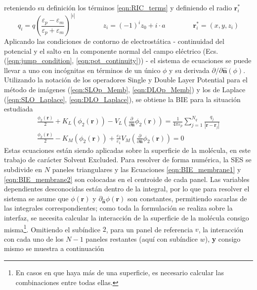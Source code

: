 \documentclass[12pt, oneside, numbers, spanish]{ezthesis}
\numberwithin{equation}{section}
\begin{document}
reteniendo su definición los términos \ref{eqn:RIC_terms} y definiendo el radio $\mathbf{r}^*_i$
\begin{equation*}
q_i = q\left(\frac{\varepsilon_p - \varepsilon_m}{\varepsilon_p + \varepsilon_m}\right)^{|i|} \qquad\qquad z_i=(-1)^iz_0 + i\cdot a \qquad\qquad \mathbf{r}^*_i = (x, y, z_i)
\end{equation*}
Aplicando las condiciones de contorno de electrostática - continuidad del potencial y el salto en la componente normal del campo eléctrico (Ecs. (\ref{eqn:jump_condition}, \ref{eqn:pot_continuity})) - el sistema de ecuaciones se puede llevar a uno con incógnitas en términos de un único $\phi$ y su derivada $\partial/\partial\hat{\mathbf{n}}(\phi)$. Utilizando la notación de los operadores Single y Double Layer Potential para el método de imágenes (\ref{eqn:SLOp_Memb}, \ref{eqn:DLOp_Memb}) y los de Laplace (\ref{eqn:SLO_Laplace}, \ref{eqn:DLO_Laplace}), se obtiene la BIE para la situación estudiada
\begin{gather}
\frac{\phi_2(\mathbf{r})}{2} + K_L(\phi_2(\mathbf{r})) - V_L\left(\frac{\partial}{\partial\hat{\mathbf{n}}}\phi_2(\mathbf{r})\right) = \frac{1}{4\pi\varepsilon_p}\sum_{j = 1}^{N_q}\frac{q_j}{|\mathbf{r} - \mathbf{r}_j|}\label{eqn:BIE_membrane1}\\
\frac{\phi_2(\mathbf{r})}{2} - K_M(\phi_2(\mathbf{r})) + \frac{\varepsilon_2}{\varepsilon_1}V_M\left(\frac{\partial}{\partial\hat{\mathbf{n}}}\phi_2(\mathbf{r})\right) = 0\label{eqn:BIE_membrane2}
\end{gather}
Estas ecuaciones están siendo aplicadas sobre la superficie de la molécula, en este trabajo de carácter Solvent Excluded. Para resolver de forma numérica, la SES se subdivide en $N$ paneles triangulares y las Ecuaciones \ref{eqn:BIE_membrane1} y \ref{eqn:BIE_membrane2} son colocadas en el centroide de cada panel. Las variables dependientes desconocidas están dentro de la integral, por lo que para resolver el sistema se asume que $\phi(\mathbf{r})$ y $\partial_{\hat{\mathbf{n}}}\phi(\mathbf{r})$ son constantes, permitiendo sacarlas de las integrales correspondientes; como toda la formulación se realiza sobre la interfaz, se necesita calcular la interacción de la superficie de la molécula consigo misma\footnote{En casos en que haya más de una superficie, es necesario calcular las combinaciones entre todas ellas.}. Omitiendo el subíndice $2$, para un panel de referencia $v$, la interacción con cada uno de los $N-1$ paneles restantes (aquí con subíndice $w$), \textbf{y} consigo mismo se muestra a continuación
\end{document}
